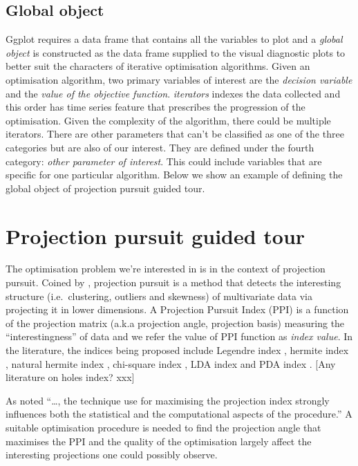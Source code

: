 \documentclass[12pt]{article}
\begin{document}
\hypertarget{global-object}{%
\subsection{Global object}\label{global-object}}

Ggplot requires a data frame that contains all the variables to plot and
a \emph{global object} is constructed as the data frame supplied to the
visual diagnostic plots to better suit the characters of iterative
optimisation algorithms. Given an optimisation algorithm, two primary
variables of interest are the \emph{decision variable} and the
\emph{value of the objective function}. \emph{iterators} indexes the
data collected and this order has time series feature that prescribes
the progression of the optimisation. Given the complexity of the
algorithm, there could be multiple iterators. There are other parameters
that can't be classified as one of the three categories but are also of
our interest. They are defined under the fourth category: \emph{other
parameter of interest}. This could include variables that are specific
for one particular algorithm. Below we show an example of defining the
global object of projection pursuit guided tour.

\hypertarget{tour}{%
\section{Projection pursuit guided tour}\label{tour}}

The optimisation problem we're interested in is in the context of
projection pursuit. Coined by \citet{friedman1974projection}, projection
pursuit is a method that detects the interesting structure
(i.e.~clustering, outliers and skewness) of multivariate data via
projecting it in lower dimensions. A Projection Pursuit Index (PPI) is a
function of the projection matrix (a.k.a projection angle, projection
basis) measuring the ``interestingness'' of data and we refer the value
of PPI function as \emph{index value}. In the literature, the indices
being proposed include Legendre index \citep{friedman1974projection},
hermite index \citep{hall1989polynomial}, natural hermite index
\citep{cook1993projection}, chi-square index
\citep{posse1995projection}, LDA index \citep{lee2005projection} and PDA
index \citep{lee2010projection}. {[}Any literature on holes index?
xxx{]}

As \citet{friedman1974projection} noted ``\ldots{}, the technique use
for maximising the projection index strongly influences both the
statistical and the computational aspects of the procedure.'' A suitable
optimisation procedure is needed to find the projection angle that
maximises the PPI and the quality of the optimisation largely affect the
interesting projections one could possibly observe.
\end{document}
